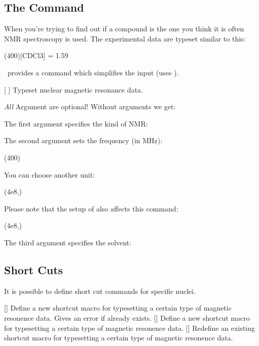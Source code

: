 \documentclass[load-preamble+]{cnltx-doc}
\begin{document}
\subsection{The  Command}

When you're trying to find out if a compound is the one you think it is often
NMR spectroscopy is used.  The experimental data are typeset similar to this:
\begin{center}
  \NMR(400)[CDCl3] = \num{1.59}
\end{center}
\chemmacros\ provides a command which simplifies the input (uses
).

\begin{commands}
  [\sarg{}%
    ]
    Typeset nuclear magnetic resonance data.
\end{commands}

\emph{All} Argument are optional! Without arguments we get:
\begin{example}
  \NMR \par
  \NMR*
\end{example}

The first argument specifies the kind of NMR:
\begin{example}
\end{example}

The second argument sets the frequency (in \si{\mega\hertz}):
\begin{example}
  \NMR(400)
\end{example}
You can choose another unit:
\begin{example}
  \NMR(4e8,\hertz)
\end{example}
Please note that the setup of  also affects this command:
\begin{example}
  \NMR(4e8,\hertz)
\end{example}

The third argument specifies the solvent:
\begin{example}
  \NMR[CDCl3]
\end{example}

\subsection{Short Cuts}

It is possible to define short cut commands for specific nuclei.
\begin{commands}
  []
    Define a new shortcut macro for typesetting a certain
    type of magnetic resonence data.  Gives an error if  already
    exists.
  []
    Define a new shortcut macro for typesetting a certain
    type of magnetic resonence data.
  []
    Redefine an existing shortcut macro for typesetting a certain type of
    magnetic resonence data.
\end{commands}
\end{document}
